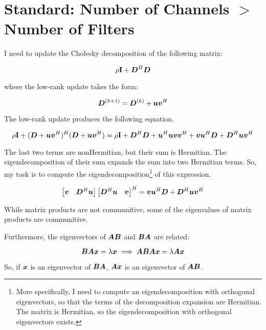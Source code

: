 \documentclass{article}
\begin{document}
\section{Standard: Number of Channels $>$ Number of Filters}

I need to update the Cholesky decomposition of the following matrix:

\begin{equation}
\rho{\bf I} + \bm{D}^H\bm{D}
\end{equation}

where the low-rank update takes the form:

\begin{equation}
\bm{D}^{(k+1)} = \bm{D}^{(k)} + \bm{u}\bm{v}^H
\end{equation}

The low-rank update produces the following equation.

\begin{equation}
\rho{\bf I} + (\bm{D} + \bm{u}\bm{v}^H)^H(\bm{D} + \bm{u}\bm{v}^H) = \rho{\bf I} + \bm{D}^H\bm{D} + \bm{u}^H\bm{u} \bm{v}\bm{v}^H + \bm{v}\bm{u}^H\bm{D} + \bm{D}^H\bm{u}\bm{v}^H
\end{equation}

The last two terms are nonHermitian, but their sum is Hermitian. The eigendecomposition of their sum expands the sum into two Hermitian terms. So, my task is to compute the eigendecomposition\footnote{More specifically, I need to compute an eigendecomposition with orthogonal eigenvectors, so that the terms of the decomposition expansion are Hermitian. The matrix is Hermitian, so the eigendecomposition with orthogonal eigenvectors exists.}  of this expression.

\begin{equation}
\begin{bmatrix}
\bm{v} & \bm{D}^H\bm{u} 
\end{bmatrix}
\begin{bmatrix}
\bm{D}^H\bm{u} & \bm{v}
\end{bmatrix}^H = \bm{v}\bm{u}^H \bm{D} + \bm{D}^H\bm{u}\bm{v}^H
\end{equation}

While matrix products are not communitive, some of the eigenvalues of matrix products are communitive.

Furthermore, the eigenvectors of $\bm{A}\bm{B}$ and $\bm{B}\bm{A}$ are related:

\begin{equation}
\bm{B}\bm{A}\bm{x} = \lambda\bm{x}  \implies  \bm{A}\bm{B}\bm{A}\bm{x} = \lambda\bm{A}\bm{x}
\end{equation}

So, if $\bm{x}$ is an eigenvector of $\bm{B}\bm{A}$, $\bm{A}\bm{x}$ is an eigenvector of $\bm{A}\bm{B}$.
\end{document}
